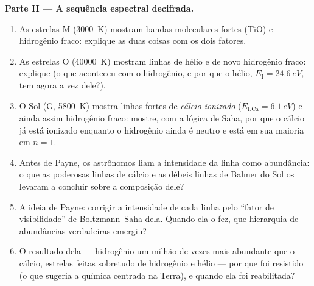 \begin{problem}
\medskip\noindent\textbf{Parte II --- A sequência espectral
decifrada.}
\begin{enumerate}[resume]
  \item As estrelas M (\qty{3000}{K}) mostram bandas moleculares fortes
        (TiO) e hidrogênio fraco: explique as duas coisas com os dois fatores.
  \item As estrelas O (\qty{40000}{K}) mostram linhas de hélio e de novo
        hidrogênio fraco: explique (o que aconteceu com o hidrogênio, e
        por que o hélio, $E_{\text{I}} = \qty{24.6}{eV}$, tem agora a
        vez dele?).
  \item O Sol (G, \qty{5800}{K}) mostra linhas fortes de
        \emph{cálcio ionizado} ($E_{\text{I,Ca}} = \qty{6.1}{eV}$)
        e ainda assim hidrogênio fraco: mostre, com a lógica de Saha,
        por que o cálcio já está ionizado enquanto o hidrogênio ainda é
        neutro e está em sua maioria em $n = 1$.
  \item Antes de Payne, os astrônomos liam a intensidade da linha como
        abundância: o que as poderosas linhas de cálcio e as débeis
        linhas de Balmer do Sol os levaram a concluir sobre a composição dele?
  \item A ideia de Payne: corrigir a intensidade de cada linha pelo
        ``fator de visibilidade'' de Boltzmann--Saha dela. Quando ela o
        fez, que hierarquia de abundâncias verdadeiras emergiu?
  \item O resultado dela --- hidrogênio um milhão de vezes mais
        abundante que o cálcio, estrelas feitas sobretudo de hidrogênio
        e hélio --- por que foi resistido (o que sugeria a química
        centrada na Terra), e quando ela foi reabilitada?
\end{enumerate}


\end{problem}
